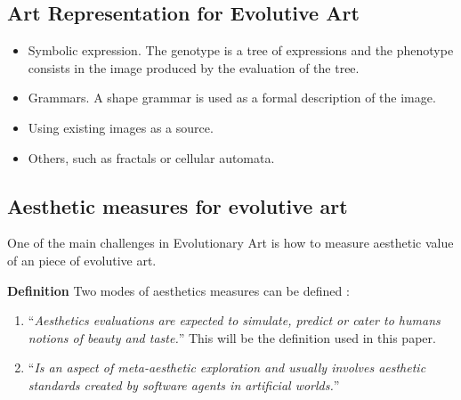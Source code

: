 \documentclass[conference]{IEEEtran}
\begin{document}
\subsection{Art Representation for Evolutive Art} \label{evo_art:repr}
\begin{itemize}
	\item Symbolic expression. The genotype is a tree of expressions and the phenotype consists in the image produced  by the evaluation of the tree.
	\item Grammars. A shape grammar is used as a formal description of the image.
	\item Using existing images as a source. 
	\item Others, such as fractals or cellular automata.
\end{itemize}

\subsection{Aesthetic measures for evolutive art}\label{evo_art:aesth}
One of the main challenges in Evolutionary Art is how to measure aesthetic value of an piece of evolutive art.

{\bf Definition} Two modes of aesthetics measures can be defined \cite{galanter2012computational}: 
\begin{enumerate}
\item ``{\em Aesthetics evaluations are expected to simulate, predict or cater to humans notions of beauty and taste.}'' This will be the definition used in this paper. 
\item ``{\em Is an aspect of meta-aesthetic exploration and usually involves aesthetic standards created by software agents in artificial worlds.}''
\end{enumerate}
\end{document}

